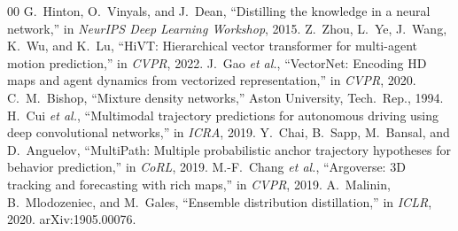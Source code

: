 \documentclass[conference]{IEEEtran}
\begin{document}
\begin{thebibliography}{00}
 G.~Hinton, O.~Vinyals, and J.~Dean, ``Distilling the knowledge
in a neural network,'' in \emph{NeurIPS Deep Learning Workshop}, 2015.
 Z.~Zhou, L.~Ye, J.~Wang, K.~Wu, and K.~Lu, ``HiVT: Hierarchical
vector transformer for multi-agent motion prediction,'' in \emph{CVPR}, 2022.
 J.~Gao \emph{et al.}, ``VectorNet: Encoding HD maps and agent
dynamics from vectorized representation,'' in \emph{CVPR}, 2020.
 C.~M.~Bishop, ``Mixture density networks,'' Aston University,
Tech.\ Rep., 1994.
 H.~Cui \emph{et al.}, ``Multimodal trajectory predictions for
autonomous driving using deep convolutional networks,'' in \emph{ICRA}, 2019.
 Y.~Chai, B.~Sapp, M.~Bansal, and D.~Anguelov, ``MultiPath:
Multiple probabilistic anchor trajectory hypotheses for behavior prediction,'' in
\emph{CoRL}, 2019.
 M.-F.~Chang \emph{et al.}, ``Argoverse: 3D tracking and
forecasting with rich maps,'' in \emph{CVPR}, 2019.
 A.~Malinin, B.~Mlodozeniec, and M.~Gales, ``Ensemble distribution
distillation,'' in \emph{ICLR}, 2020. arXiv:1905.00076.
\end{thebibliography}
\end{document}
